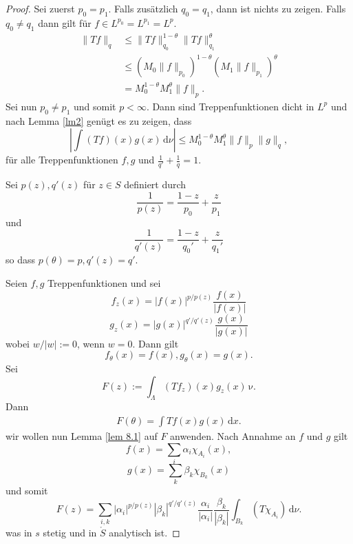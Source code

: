 \documentclass[
paper=a4,
bibtotocnumbered,
liststotocnumbered,
tablecaptionabove,
pointlessnumbers,
twoside,
openright,
10pt
]
{report}
\theoremstyle{definition}
\numberwithin{equation}{chapter}
\begin{document}
\begin{proof}
Sei zuerst $p_0=p_1$. Falls zusätzlich  $q_0=q_1$, dann ist nichts zu zeigen.  Falls $q_0\neq q_1$ dann gilt für $f\in L^{p_0} = L^{p_1} = L^p$.
\begin{align*}
\| Tf\|_q &\le \| Tf\|_{q_0}^{1-\theta} \| Tf\|_{q_1}^\theta\\
&\le (M_0 \| f\|_{p_0})^{1-\theta} (M_1 \| f\|_{p_1} )^\theta \\
&= M_0^{1-\theta} M_1^\theta \| f\|_p.
\end{align*}
Sei nun $p_0 \neq p_1$ und somit $p<\infty$. Dann sind Treppenfunktionen dicht in $L^p$ und nach Lemma \ref{lm2} genügt es zu zeigen, dass
\begin{equation}
|\int (Tf) (x) g(x) \, \mathrm d\nu| \le M_0^{1-\theta} M_1^\theta \| f\|_p \| g\|_q,
\end{equation}
für alle Treppenfunktionen $f,g$ und $\frac{1}{q'} + \frac{1}{q} =1$.

Sei $p(z), q'(z)$ für $z\in S$ definiert durch
\begin{equation}
\frac{1}{p(z)} = \frac{1-z}{p_0} + \frac{z}{p_1} 
\end{equation}
und
\begin{equation}
\frac{1}{q'(z)} = \frac{1-z}{q_0'} + \frac{z}{q_1'}
\end{equation}
so dass $p(\theta)=p, q'(z)=q'$.

Seien $f,g$ Treppenfunktionen und sei 
\begin{equation}
f_z(x)= |f(x)|^{p/p(z)} \frac{f(x)}{|f(x)|}
\end{equation}
\begin{equation}
g_z(x) = |g(x)|^{q'/q'(z)} \frac{g(x)}{|g(x)|}
\end{equation}
wobei $w/|w|:=0$, wenn $w=0$.  Dann gilt
\begin{equation}
f_\theta (x) = f(x), g_{\theta}(x) = g(x).
\end{equation}
Sei
\begin{equation}
F(z) := \int_\Lambda (Tf_z) (x) g_z(x) \, \mathrm  \nu.
\end{equation}
Dann 
\begin{align*}
F(\theta) = \int Tf(x) g(x) \, \mathrm dx.
\end{align*}
wir wollen nun Lemma \ref{lem 8.1} auf $F$ anwenden.  Nach Annahme an $f$ und $g$ gilt
\begin{equation}
f(x) = \sum_{i} \alpha_i \chi_{A_i} (x),
\end{equation}
\begin{equation}
g(x) = \sum_{k} \beta_k \chi_{B_k} (x)
\end{equation}
und somit
\begin{equation}\label{eq:16.6bes}
F(z) = \sum_{i,k} |\alpha_i|^{p/p(z)} |\beta_k |^{q'/q'(z)} \frac{\alpha_i}{|\alpha_i|} \frac{\beta_k}{|\beta_k|} \int_{B_k} (T\chi_{A_i}) \, \mathrm d\nu.
\end{equation}
was in $s$ stetig und in $\mathring{S}$ analytisch ist.


\end{proof}
\end{document}
